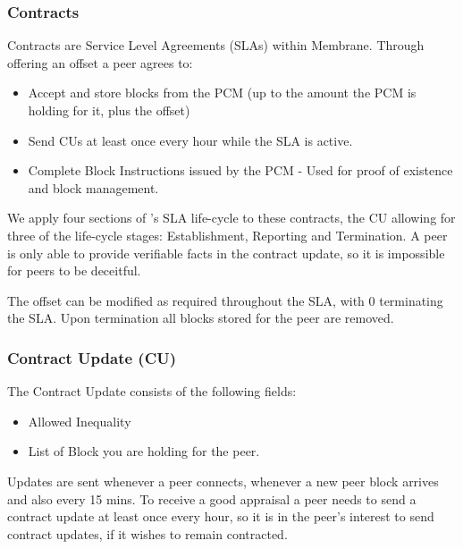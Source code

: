 \documentclass[11pt, a4paper, twoside]{report}
\begin{document}
\subsubsection{Contracts}

Contracts are Service Level Agreements (SLAs) within Membrane. Through offering an offset a peer agrees to:

\begin{itemize}
 \item Accept and store blocks from the PCM (up to the amount the PCM is holding for it, plus the offset)
 \item Send CUs at least once every hour while the SLA is active.
 \item Complete Block Instructions issued by the PCM - Used for proof of existence and block management.
\end{itemize}

We apply four sections of \cite{keller2002defining}'s SLA life-cycle to these contracts, the CU allowing for three of the life-cycle stages: Establishment, Reporting and Termination. A peer is only able to provide verifiable facts in the contract update, so it is impossible for peers to be deceitful.

The offset can be modified as required throughout the SLA, with 0 terminating the SLA. Upon termination all blocks stored for the peer are removed.

\subsubsection{Contract Update (CU)}

The Contract Update consists of the following fields:

\begin{itemize}
 \item Allowed Inequality
 \item List of Block you are holding for the peer.
\end{itemize}

Updates are sent whenever a peer connects, whenever a new peer block arrives and also every 15 mins. To receive a good appraisal a peer needs to send a contract update at least once every hour, so it is in the peer's interest to send contract updates, if it wishes to remain contracted.
\end{document}
